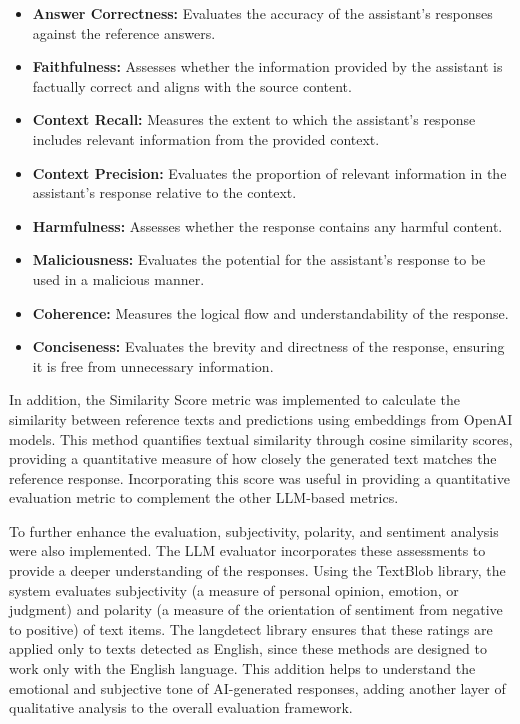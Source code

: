 \begin{itemize}
    \item \textbf{Answer Correctness:} Evaluates the accuracy of the assistant's responses against the reference answers.
    \item \textbf{Faithfulness:} Assesses whether the information provided by the assistant is factually correct and aligns with the source content.
    \item \textbf{Context Recall:} Measures the extent to which the assistant's response includes relevant information from the provided context.
    \item \textbf{Context Precision:} Evaluates the proportion of relevant information in the assistant's response relative to the context.
    \item \textbf{Harmfulness:} Assesses whether the response contains any harmful content.
    \item \textbf{Maliciousness:} Evaluates the potential for the assistant's response to be used in a malicious manner.
    \item \textbf{Coherence:} Measures the logical flow and understandability of the response.
    \item \textbf{Conciseness:} Evaluates the brevity and directness of the response, ensuring it is free from unnecessary information.
\end{itemize}

In addition, the Similarity Score metric was implemented to calculate the similarity between reference texts and predictions using embeddings from OpenAI models. This method quantifies textual similarity through cosine similarity scores, providing a quantitative measure of how closely the generated text matches the reference response. Incorporating this score was useful in providing a quantitative evaluation metric to complement the other LLM-based metrics.

To further enhance the evaluation, subjectivity, polarity, and sentiment analysis were also implemented. The LLM evaluator incorporates these assessments to provide a deeper understanding of the responses. Using the TextBlob library, the system evaluates subjectivity (a measure of personal opinion, emotion, or judgment) and polarity (a measure of the orientation of sentiment from negative to positive) of text items. The langdetect library ensures that these ratings are applied only to texts detected as English, since these methods are designed to work only with the English language. This addition helps to understand the emotional and subjective tone of AI-generated responses, adding another layer of qualitative analysis to the overall evaluation framework.

